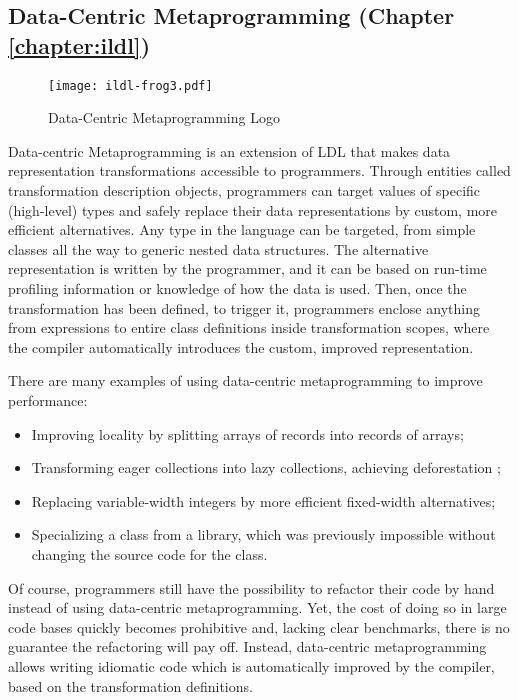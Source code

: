 \subsection{Data-Centric Metaprogramming (Chapter \ref{chapter:ildl})}

\begin{wrapfigure}{r}{40mm}
  \centering
  \vspace{-2em}
  \texttt{[image: ildl-frog3.pdf]}
  \vspace{-1em}
  \caption{Data-Centric Metaprogramming Logo}
  \vspace{-2em}
\end{wrapfigure}


Data-centric Metaprogramming is an extension of LDL that makes data representation transformations accessible to programmers. Through entities called transformation description objects, programmers can target values of specific (high-level) types and safely replace their data representations by custom, more efficient alternatives. Any type in the language can be targeted, from simple classes all the way to generic nested data structures. The alternative representation is written by the programmer, and it can be based on run-time profiling information or knowledge of how the data is used. Then, once the transformation has been defined, to trigger it,  programmers enclose anything from expressions to entire class definitions inside transformation scopes, where the compiler automatically introduces the custom, improved representation.

There are many examples of using data-centric metaprogramming to improve performance:
\begin{itemize}
  \item Improving locality by splitting arrays of records into records of arrays;
  \item Transforming eager collections into lazy collections, achieving deforestation \cite{wadler-deforestation};
  \item Replacing variable-width integers by more efficient fixed-width alternatives;
  \item Specializing a class from a library, which was previously impossible without changing the source code for the class.
\end{itemize}

Of course, programmers still have the possibility to refactor their code by hand instead of using data-centric metaprogramming. Yet, the cost of doing so in large code bases quickly becomes prohibitive and, lacking clear benchmarks, there is no guarantee the refactoring will pay off. Instead, data-centric metaprogramming allows writing idiomatic code which is automatically improved by the compiler, based on the transformation definitions.

